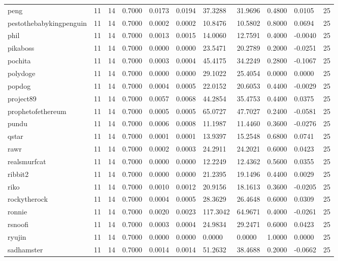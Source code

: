 \begin{table}[htbp]
\begin{tabular}{lllllllllll}
peng & 11 & 14 & 0.7000 & 0.0173 & 0.0194 & 37.3288 & 31.9696 & 0.4800 & 0.0105 & 25 \\
pestothebabykingpenguin & 11 & 14 & 0.7000 & 0.0002 & 0.0002 & 10.8476 & 10.5802 & 0.8000 & 0.0694 & 25 \\
phil & 11 & 14 & 0.7000 & 0.0013 & 0.0015 & 14.0060 & 12.7591 & 0.4000 & -0.0040 & 25 \\
pikaboss & 11 & 14 & 0.7000 & 0.0000 & 0.0000 & 23.5471 & 20.2789 & 0.2000 & -0.0251 & 25 \\
pochita & 11 & 14 & 0.7000 & 0.0003 & 0.0004 & 45.4175 & 34.2249 & 0.2800 & -0.1067 & 25 \\
polydoge & 11 & 14 & 0.7000 & 0.0000 & 0.0000 & 29.1022 & 25.4054 & 0.0000 & 0.0000 & 25 \\
popdog & 11 & 14 & 0.7000 & 0.0004 & 0.0005 & 22.0152 & 20.6053 & 0.4400 & -0.0029 & 25 \\
project89 & 11 & 14 & 0.7000 & 0.0057 & 0.0068 & 44.2854 & 35.4753 & 0.4400 & 0.0375 & 25 \\
prophetofethereum & 11 & 14 & 0.7000 & 0.0005 & 0.0005 & 65.0727 & 47.7027 & 0.2400 & -0.0581 & 25 \\
pundu & 11 & 14 & 0.7000 & 0.0006 & 0.0008 & 11.1987 & 11.4460 & 0.3600 & -0.0276 & 25 \\
qstar & 11 & 14 & 0.7000 & 0.0001 & 0.0001 & 13.9397 & 15.2548 & 0.6800 & 0.0741 & 25 \\
rawr & 11 & 14 & 0.7000 & 0.0002 & 0.0003 & 24.2911 & 24.2021 & 0.6000 & 0.0423 & 25 \\
realsmurfcat & 11 & 14 & 0.7000 & 0.0000 & 0.0000 & 12.2249 & 12.4362 & 0.5600 & 0.0355 & 25 \\
ribbit2 & 11 & 14 & 0.7000 & 0.0000 & 0.0000 & 21.2395 & 19.1496 & 0.4400 & 0.0029 & 25 \\
riko & 11 & 14 & 0.7000 & 0.0010 & 0.0012 & 20.9156 & 18.1613 & 0.3600 & -0.0205 & 25 \\
rockytherock & 11 & 14 & 0.7000 & 0.0004 & 0.0005 & 28.3629 & 26.4648 & 0.6000 & 0.0309 & 25 \\
ronnie & 11 & 14 & 0.7000 & 0.0020 & 0.0023 & 117.3042 & 64.9671 & 0.4000 & -0.0261 & 25 \\
rsnoofi & 11 & 14 & 0.7000 & 0.0003 & 0.0004 & 24.9834 & 29.2471 & 0.6000 & 0.0423 & 25 \\
ryujin & 11 & 14 & 0.7000 & 0.0000 & 0.0000 & 0.0000 & 0.0000 & 1.0000 & 0.0000 & 25 \\
sadhamster & 11 & 14 & 0.7000 & 0.0014 & 0.0014 & 51.2632 & 38.4688 & 0.2000 & -0.0662 & 25 \\

\end{tabular}
\end{table}
